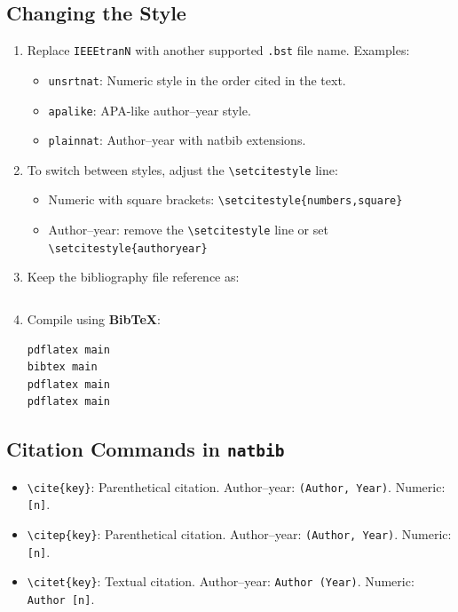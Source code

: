 \documentclass{lecturenotes}
\begin{document}
\subsection{Changing the Style}
\begin{enumerate}
    \item Replace \texttt{IEEEtranN} with another supported \texttt{.bst} file name. Examples:
    \begin{itemize}
        \item \texttt{unsrtnat}: Numeric style in the order cited in the text.
        \item \texttt{apalike}: APA-like author–year style.
        \item \texttt{plainnat}: Author–year with natbib extensions.
    \end{itemize}
    \item To switch between styles, adjust the \verb|\setcitestyle| line:
    \begin{itemize}
        \item Numeric with square brackets: \verb|\setcitestyle{numbers,square}|
        \item Author–year: remove the \verb|\setcitestyle| line or set \verb|\setcitestyle{authoryear}|
    \end{itemize}
    \item Keep the bibliography file reference as:
    \begin{verbatim}

    \end{verbatim}
    \item Compile using \textbf{BibTeX}:
    \begin{verbatim}
pdflatex main
bibtex main
pdflatex main
pdflatex main
    \end{verbatim}
\end{enumerate}

\subsection{Citation Commands in \texttt{natbib}}
\begin{itemize}
    \item \verb|\cite{key}|: Parenthetical citation.  
    Author–year: \texttt{(Author, Year)}.  
    Numeric: \texttt{[n]}.
    \item \verb|\citep{key}|: Parenthetical citation.  
    Author–year: \texttt{(Author, Year)}.  
    Numeric: \texttt{[n]}.
    \item \verb|\citet{key}|: Textual citation.  
    Author–year: \texttt{Author (Year)}.  
    Numeric: \texttt{Author [n]}.
\end{itemize}
\end{document}
